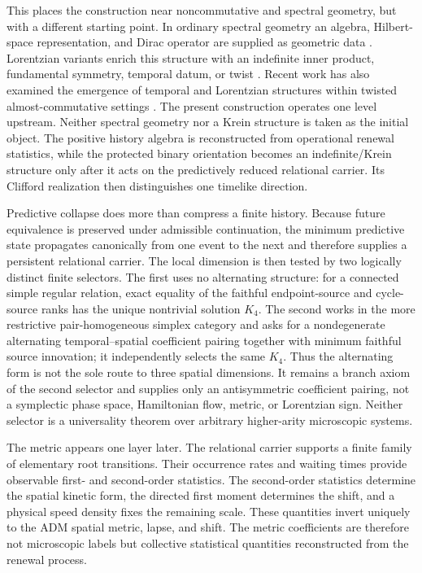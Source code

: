 \documentclass[11pt]{article}
\theoremstyle{definition}
\theoremstyle{remark}
\begin{document}
This places the construction near noncommutative and spectral geometry, but
with a different starting point.  In ordinary spectral geometry an algebra,
Hilbert-space representation, and Dirac operator are supplied as geometric
data \cite{Connes1994}.  Lorentzian variants enrich this structure with an
indefinite inner product, fundamental symmetry, temporal datum, or twist
\cite{strohmaier,franco,franco-eckstein,
vandendungenpaschkerennie2013,vandendungen2016,
DevastatoFarnsworthLizziMartinetti2018,
DevastatoFilaciMartinettiSingh2020}.  Recent work has also examined the
emergence of temporal and Lorentzian structures within twisted
almost-commutative settings \cite{nieuviarts2026a,nieuviarts2026b}.  The
present construction operates one level upstream.  Neither spectral geometry
nor a Krein structure is taken as the initial object.  The positive history
algebra is reconstructed from operational renewal statistics, while the
protected binary orientation becomes an indefinite/Krein structure only after
it acts on the predictively reduced relational carrier.  Its Clifford
realization then distinguishes one timelike direction.

Predictive collapse does more than compress a finite history.  Because future
equivalence is preserved under admissible continuation, the minimum predictive
state propagates canonically from one event to the next and therefore supplies
a persistent relational carrier.  The local dimension is then tested by two
logically distinct finite selectors.  The first uses no alternating structure:
for a connected simple regular relation, exact equality of the faithful
endpoint-source and cycle-source ranks has the unique nontrivial solution
$K_4$.  The second works in the more restrictive pair-homogeneous simplex
category and asks for a nondegenerate alternating temporal--spatial coefficient
pairing together with minimum faithful source innovation; it independently
selects the same $K_4$.  Thus the alternating form is not the sole route to
three spatial dimensions.  It remains a branch axiom of the second selector
and supplies only an antisymmetric coefficient pairing, not a symplectic phase
space, Hamiltonian flow, metric, or Lorentzian sign.  Neither selector is a
universality theorem over arbitrary higher-arity microscopic systems.

The metric appears one layer later.  The relational carrier supports a finite
family of elementary root transitions.  Their occurrence rates and waiting
times provide observable first- and second-order statistics.  The second-order
statistics determine the spatial kinetic form, the directed first moment
determines the shift, and a physical speed density fixes the remaining scale.
These quantities invert uniquely to the ADM spatial metric, lapse, and shift.
The metric coefficients are therefore not microscopic labels but collective
statistical quantities reconstructed from the renewal process.
\end{document}
